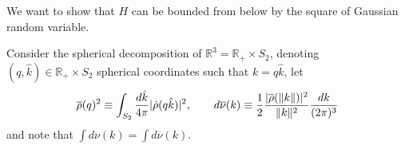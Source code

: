 
We want to show that $H$ can be bounded from below by the square of Gaussian
random variable. 

Consider the spherical decomposition of 
$\mathbb{R}^3 = \mathbb{R}_+ \times S_2$, denoting $(q,\hat{k}) \in
\mathbb{R}_+ \times S_2$ spherical coordinates such that $k =
q\hat{k}$,  let
$$
\overline{\rho}(q)^2 \equiv \int_{S_2}
\frac{d\hat{k}}{4 \pi} |\hat{\rho}(q\hat{k})|^2   ,
\qquad d\overline{\nu}(k) \equiv \frac{1}{2}
\frac{|\overline{\rho}(\|k\|)|^2}{\|k\|^2} \frac{dk}{(2\pi)^3}
$$
and note that $\int d\nu(k) = \int d\overline{\nu}(k)$.

